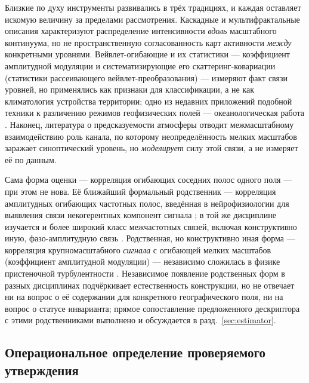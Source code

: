 \documentclass[11pt,a4paper]{article}
\begin{document}
Близкие по духу инструменты развивались в трёх традициях, и каждая оставляет искомую величину за пределами рассмотрения. Каскадные и мультифрактальные описания \cite{LovejoySchertzer2013,Lovejoy2011,Kouhen2024} характеризуют распределение интенсивности \emph{вдоль} масштабного континуума, но не пространственную согласованность карт активности \emph{между} конкретными уровнями. Вейвлет-огибающие и их статистики --- коэффициент амплитудной модуляции \cite{Farge1992,Mathis2009} и систематизирующие его скаттеринг-ковариации (статистики рассеивающего вейвлет-преобразования) \cite{Mallat2012,BrunaMallat2013,Cheng2024} --- измеряют факт связи уровней, но применялись как признаки для классификации, а не как климатология устройства территории; одно из недавних приложений подобной техники к различению режимов геофизических полей --- океанологическая работа \cite{Skinner2025}. Наконец, литература о предсказуемости атмосферы \cite{Lorenz1969,Zhang2007,RotunnoSnyder2008,Judt2020,SelzCraig2023} отводит межмасштабному взаимодействию роль канала, по которому неопределённость мелких масштабов заражает синоптический уровень, но \emph{моделирует} силу этой связи, а не измеряет её по данным.

Сама форма оценки --- корреляция огибающих соседних полос одного поля --- при этом не нова. Её ближайший формальный родственник --- корреляция амплитудных огибающих частотных полос, введённая в нейрофизиологии для выявления связи некогерентных компонент сигнала \cite{Bruns2000}; в той же дисциплине изучается и более широкий класс межчастотных связей, включая конструктивно иную, фазо-амплитудную связь \cite{Canolty2006}. Родственная, но конструктивно иная форма --- корреляция крупномасштабного \emph{сигнала} с огибающей мелких масштабов (коэффициент амплитудной модуляции) --- независимо сложилась в физике пристеночной турбулентности \cite{Mathis2009}. Независимое появление родственных форм в разных дисциплинах подчёркивает естественность конструкции, но не отвечает ни на вопрос о её содержании для конкретного географического поля, ни на вопрос о статусе инварианта; прямое сопоставление предложенного дескриптора с этими родственниками выполнено и обсуждается в разд.~\ref{sec:estimator}.

\subsection{Операциональное определение проверяемого утверждения}
\label{sec:definition}
\end{document}
